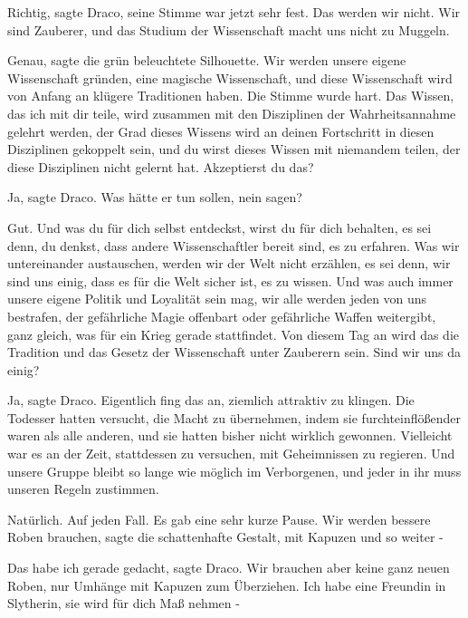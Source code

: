 \glqq{}Richtig\grqq{}, sagte Draco, seine Stimme war jetzt sehr fest. \glqq{}Das
werden wir nicht. Wir sind Zauberer, und das Studium der Wissenschaft macht uns
nicht zu Muggeln.\grqq{}

\glqq{}Genau\grqq{}, sagte die grün beleuchtete Silhouette. \glqq{}Wir werden
unsere eigene Wissenschaft gründen, eine magische Wissenschaft, und diese
Wissenschaft wird von Anfang an klügere Traditionen haben.\grqq{} Die Stimme
wurde hart. \glqq{}Das Wissen, das ich mit dir teile, wird zusammen mit den
Disziplinen der Wahrheitsannahme gelehrt werden, der Grad dieses Wissens wird an
deinen Fortschritt in diesen Disziplinen gekoppelt sein, und du wirst dieses
Wissen mit niemandem teilen, der diese Disziplinen nicht gelernt hat.
Akzeptierst du das?\grqq{}

\glqq{}Ja\grqq{}, sagte Draco. Was hätte er tun sollen, nein sagen?

\glqq{}Gut. Und was du für dich selbst entdeckst, wirst du für dich behalten, es
sei denn, du denkst, dass andere Wissenschaftler bereit sind, es zu erfahren.
Was wir untereinander austauschen, werden wir der Welt nicht erzählen, es sei
denn, wir sind uns einig, dass es für die Welt sicher ist, es zu wissen. Und was
auch immer unsere eigene Politik und Loyalität sein mag, wir alle werden jeden
von uns bestrafen, der gefährliche Magie offenbart oder gefährliche Waffen
weitergibt, ganz gleich, was für ein Krieg gerade stattfindet. Von diesem Tag an
wird das die Tradition und das Gesetz der Wissenschaft unter Zauberern sein.
Sind wir uns da einig?\grqq{}

\glqq{}Ja\grqq{}, sagte Draco. Eigentlich fing das an, ziemlich attraktiv zu
klingen. Die Todesser hatten versucht, die Macht zu übernehmen, indem sie
furchteinflößender waren als alle anderen, und sie hatten bisher nicht wirklich
gewonnen. Vielleicht war es an der Zeit, stattdessen zu versuchen, mit
Geheimnissen zu regieren. \glqq{}Und unsere Gruppe bleibt so lange wie möglich im
Verborgenen, und jeder in ihr muss unseren Regeln zustimmen.\grqq{}

\glqq{}Natürlich. Auf jeden Fall.\grqq{} Es gab eine sehr kurze Pause. \glqq{}Wir
werden bessere Roben brauchen\grqq{}, sagte die schattenhafte Gestalt, \glqq{}mit
Kapuzen und so weiter -\grqq{}

\glqq{}Das habe ich gerade gedacht\grqq{}, sagte Draco. \glqq{}Wir brauchen aber
keine ganz neuen Roben, nur Umhänge mit Kapuzen zum Überziehen. Ich habe eine
Freundin in Slytherin, sie wird für dich Maß nehmen -\grqq{}

